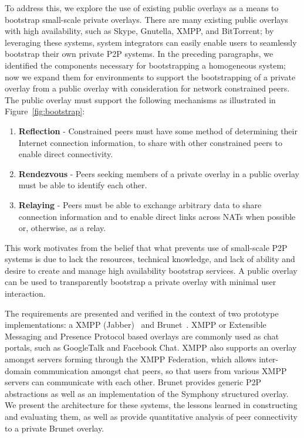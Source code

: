 \documentclass[conference]{IEEEtran}
\begin{document}
To address this, we explore the use of existing public overlays as a means to
bootstrap small-scale private overlays.  There are many existing public
overlays with high availability, such as Skype, Gnutella, XMPP, and BitTorrent;
by leveraging these systems, system integrators can easily enable users to
seamlessly bootstrap their own private P2P systems.  In the preceding
paragraphs, we identified the components necessary for bootstrapping a
homogeneous system; now we expand them for environments to support the
bootstrapping of a private overlay from a public overlay with consideration for
network constrained peers.  The public overlay must support the following
mechanisms as illustrated in Figure~\ref{fig:bootstrap}:
\begin{enumerate}
\item \textbf{Reflection} - Constrained peers must have some method of
determining their Internet connection information, to share with other
constrained peers to enable direct connectivity.
\item \textbf{Rendezvous} - Peers seeking members of a private overlay in a
public overlay must be able to identify each other.
\item \textbf{Relaying} - Peers must be able to exchange arbitrary data to
share connection information and to enable direct links across NATs when
possible or, otherwise, as a relay.
\end{enumerate}
This work motivates from the belief that what prevents use of small-scale P2P
systems is due to lack the resources, technical knowledge, and lack of ability
and desire to create and manage high availability bootstrap services.  A public
overlay can be used to transparently bootstrap a private overlay with minimal
user interaction.

The requirements are presented and verified in the context of two prototype
implementations: a XMPP (Jabber)~\cite{xmpp} and Brunet~\cite{brunet}.  XMPP or
Extensible Messaging and Presence Protocol based overlays are commonly used as
chat portals, such as GoogleTalk and Facebook Chat.  XMPP also supports an
overlay amongst servers forming through the XMPP Federation, which allows
inter-domain communication amongst chat peers, so that users from various XMPP
servers can communicate with each other.  Brunet provides generic P2P
abstractions as well as an implementation of the Symphony structured overlay.
We present the architecture for these systems, the lessons learned in
constructing and evaluating them,  as well as provide quantitative analysis of
peer connectivity to a private Brunet overlay.
\end{document}
